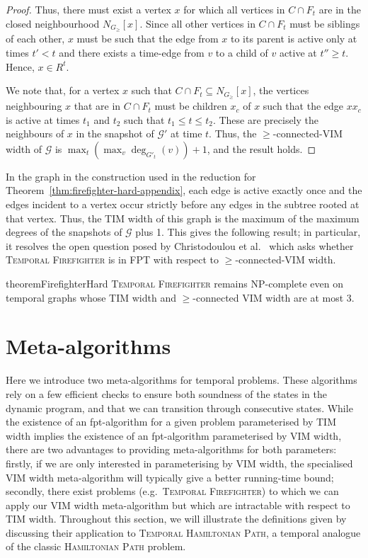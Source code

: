 \documentclass[a4paper,UKenglish,cleveref, autoref, thm-restate]{lipics-v2021} %
\begin{document}
\begin{toappendix}
\begin{proof}
    Thus, there must exist a vertex $x$ for which all vertices in $C\cap F_t$ are in the closed neighbourhood $N_{G_{\geq}}[x]$. Since all other vertices in $C\cap F_t$ must be siblings of each other, $x$ must be such that the edge from $x$ to its parent is active only at times $t'<t$ and there exists a time-edge from $v$ to a child of $v$ active at $t''\geq t$. Hence, $x\in R^t$.

    We note that, for a vertex $x$ such that $C\cap F_t\subseteq N_{G_{\geq}}[x]$, the vertices neighbouring $x$ that are in $C\cap F_t$ must be children $x_c$ of $x$ such that the edge $xx_c$ is active at times $t_1$ and $t_2$ such that $t_1\leq t\leq t_2$. These are precisely the neighbours of $x$ in the snapshot of $\mathcal{G}'$ at time $t$. Thus, the $\geq$-connected-VIM width of $\mathcal{G}$ is $\max_t(\max_v\deg_{G'_t}(v))+1$, and the result holds.
\end{proof}
In the graph in the construction used in the reduction for Theorem~\ref{thm:firefighter-hard-appendix}, each edge is active exactly once and the edges incident to a vertex occur strictly before any edges in the subtree rooted at that vertex. Thus, the TIM width of this graph is the maximum of the maximum degrees of the snapshots of $\mathcal{G}$ plus 1. This gives the following result; in particular, it resolves the open question posed by Christodoulou et al.~\cite{christodoulou_making_2024} which asks whether \textsc{Temporal Firefighter} is in FPT with respect to $\geq$-connected-VIM width.


\begin{restatable}{theorem}{FirefighterHard}\label{thm:firefighter-hard}
         \textsc{Temporal Firefighter} remains NP-complete even on temporal graphs whose TIM width and $\geq$-connected VIM width are at most 3.
 \end{restatable}
\end{toappendix}
\section{Meta-algorithms}\label{sec:meta}
Here we introduce two meta-algorithms for temporal problems. These algorithms rely on a few efficient checks to ensure both soundness of the states in the dynamic program, and that we can transition through consecutive states.  While the existence of an fpt-algorithm for a given problem parameterised by TIM width implies the existence of an fpt-algorithm parameterised by VIM width, there are two advantages to providing meta-algorithms for both parameters: firstly, if we are only interested in parameterising by VIM width, the specialised VIM width meta-algorithm will typically give a better running-time bound; secondly, there exist problems (e.g.~\textsc{Temporal Firefighter}) to which we can apply our VIM width meta-algorithm but which are intractable with respect to TIM width. Throughout this section, we will illustrate the definitions given by discussing their application to \textsc{Temporal Hamiltonian Path}, a temporal analogue of the classic \textsc{Hamiltonian Path} problem.
\end{document}
